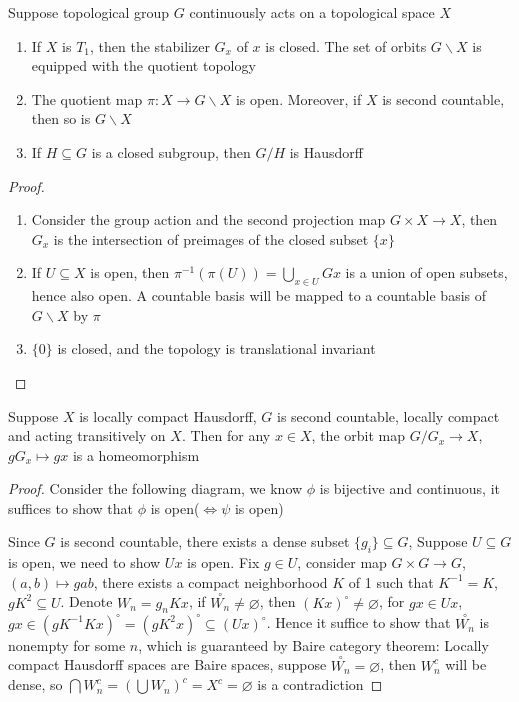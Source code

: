 \documentclass[main]{subfiles}
\begin{document}
\begin{lemma}
Suppose topological group $G$ continuously acts on a topological space $X$
\begin{enumerate}
\item If $X$ is $T_1$, then the stabilizer $G_x$ of $x$ is closed. The set of orbits $G\backslash X$ is equipped with the quotient topology
\item The quotient map $\pi: X\to G\backslash X$ is open. Moreover, if $X$ is second countable, then so is $G\backslash X$
\item If $H\subseteq G$ is a closed subgroup, then $G/H$ is Hausdorff
\end{enumerate}
\end{lemma}

\begin{proof}
\begin{enumerate}
\item Consider the group action and the second projection map $G\times X\to X$, then $G_x$ is the intersection of preimages of the closed subset $\{x\}$
\item If $U\subseteq X$ is open, then $\pi^{-1}(\pi(U))=\displaystyle\bigcup_{x\in U}Gx$ is a union of open subsets, hence also open. A countable basis will be mapped to a countable basis of $G\backslash X$ by $\pi$
\item $\{0\}$ is closed, and the topology is translational invariant
\end{enumerate}
\end{proof}

\begin{theorem}
Suppose $X$ is locally compact Hausdorff, $G$ is second countable, locally compact and acting transitively on $X$. Then for any $x\in X$, the orbit map $G/G_x\to X$, $gG_x\mapsto gx$ is a homeomorphism
\end{theorem}

\begin{proof}
Consider the following diagram, we know $\phi$ is bijective and continuous, it suffices to show that $\phi$ is open($\iff\psi$ is open)
\begin{center}
\end{center}
Since $G$ is second countable, there exists a dense subset $\{g_i\}\subseteq G$, 
Suppose $U\subseteq G$ is open, we need to show $Ux$ is open. Fix $g\in U$, consider map $G\times G\to G$, $(a,b)\mapsto gab$, there exists a compact neighborhood $K$ of 1 such that $K^{-1}=K$, $gK^2\subseteq U$. Denote $W_n=g_nKx$, if $\overset{\circ}{W_n}\neq\varnothing$, then $(Kx)^\circ\neq\varnothing$, for $gx\in Ux$, $gx\in (gK^{-1}Kx)^\circ=(gK^2x)^\circ\subseteq (Ux)^\circ$. Hence it suffice to show that $\overset\circ{W_n}$ is nonempty for some $n$, which is guaranteed by Baire category theorem: Locally compact Hausdorff spaces are Baire spaces, suppose $\overset\circ{W_n}=\varnothing$, then $W_n^c$ will be dense, so $\bigcap W_n^c=(\bigcup W_n)^c=X^c=\varnothing$ is a contradiction
\end{proof}
\end{document}
